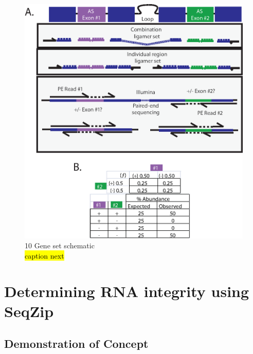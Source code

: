   \begin{figure}[htbp] %
    \centering 
    \includegraphics{Figures/Chapter2/10GeneSetSchematic.eps}
    \caption[10 Gene Set schematic]
    {
      10 Gene set schematic\\
      \hl{caption next}
	    }
    \label{fig:Multiplex Study Design}
  	\end{figure}

\section{Determining RNA integrity using SeqZip}\label{sec: SeqZip Integrity}

  \subsection{Demonstration of Concept}

